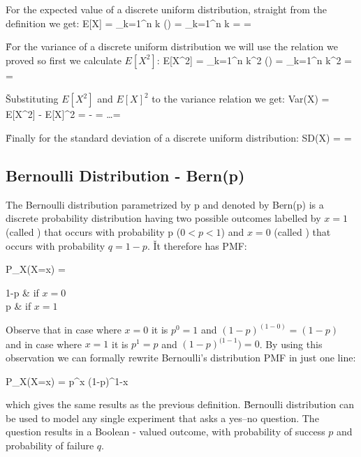 For the expected value of a discrete uniform distribution, straight from the definition we get:
\bse
E[X] = \sum_{k=1}^n k () =  \sum_{k=1}^n k =   = 
\ese

\v

For the variance of a discrete uniform distribution we will use the relation we proved so first we calculate $E[X^2]$:
\bse
E[X^2] = \sum_{k=1}^n k^2 () =  \sum_{k=1}^n k^2 =  
= 
\ese

\v

Substituting $E[X^2]$ and $E[X]^2$ to the variance relation we get:
\bse
Var(X) = E[X^{2}] - E[X]^{2} =  -  = \ldots = 
\ese

\v

Finally for the standard deviation of a discrete uniform distribution:
\bse
SD(X) =  = 
\ese

\subsection{Bernoulli Distribution - Bern(p)}

The Bernoulli distribution parametrized by p and denoted by Bern(p) is a discrete probability distribution having two
possible outcomes labelled by $x=1$ (called ) that occurs with probability p ($ 0<p<1$) and $x=0$
(called ) that occurs with probability $q=1-p$. \v

It therefore has PMF:

\bse
P_{X}(X=x) = \begin{cases*} 1-p & if $x = 0$ \\ p & if $x = 1$ \end{cases*}
\ese
\ed

Observe that in case where $x=0$ it is $p^0 = 1$ and $(1-p)^{(1-0)} = (1-p)$ and in case where $x=1$ it is $p^1 = p$
and $(1-p)^{(1-1}) = 0$. By using this observation we can formally rewrite Bernoulli's distribution PMF in just one
line:

\bse
P_{X}(X=x) = p^{x} (1-p)^{1-x}
\ese
\ed

which gives the same results as the previous definition. \v

Bernoulli distribution can be used to model any single experiment that asks a yes–no question. The question results
in a Boolean - valued outcome, with probability of success $p$ and probability of failure $q$.


